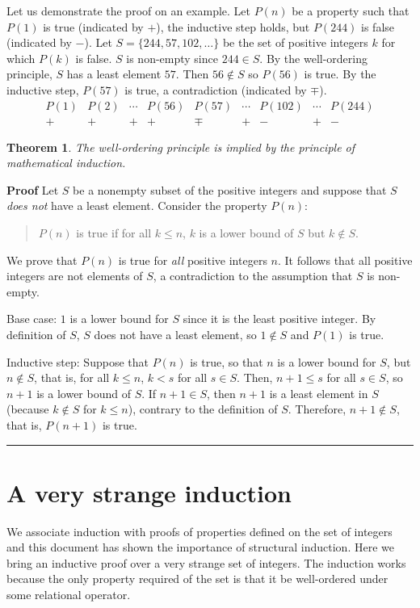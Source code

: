 \documentclass[11pt,a4paper]{report}
\newcommand*{\qed}{\hfill\rule{1ex}{1.5ex}}
\newtheorem{theorem}{Theorem}
\begin{document}
Let us demonstrate the proof on an example. Let $P(n)$ be a property such that $P(1)$ is true (indicated by $+$), the inductive step holds, but $P(244)$ is false (indicated by $-$). Let $S=\{244,57,102,\ldots\}$ be the set of positive integers $k$ for which $P(k)$ is false. $S$ is non-empty since $244\in S$. By the well-ordering principle, $S$ has a least element $57$. Then $56\not\in S$ so $P(56)$ is true. By the inductive step, $P(57)$ is true, a contradiction (indicated by $\mp$).
\[
\begin{array}{ccccccccc}
P(1) & P(2) & \cdots & P(56) & P(57) & \cdots & P(102) & \cdots & P(244)\\
+ & + & + & + & \mp & + & -&+&-
\end{array}
\]
\begin{theorem}
The well-ordering principle is implied by the principle of mathematical induction.
\end{theorem}

\textbf{Proof} Let $S$ be a nonempty subset of the positive integers and suppose that $S$ \emph{does not} have a least element. Consider the property $P(n)$:
\begin{quote}
$P(n)$ is true if for all $k\leq n$, $k$ is a lower bound of $S$ but $k\not \in S$.
\end{quote}
We prove that $P(n)$ is true for \emph{all} positive integers $n$. It follows that all positive integers are not elements of $S$, a contradiction to the assumption that $S$ is non-empty.

Base case: $1$ is a lower bound for $S$ since it is the least positive integer. By definition of $S$, $S$ does not have a least element, so $1\not\in S$ and $P(1)$ is true.

Inductive step: Suppose that $P(n)$ is true, so that $n$ is a lower bound for $S$, but $n\not\in S$, that is, for all $k\leq n$, $k<s$ for all $s\in S$. Then, $n+1\leq s$ for all $s \in S$, so $n+1$ is a lower bound of $S$. If $n+1\in S$, then $n+1$ is a least element in $S$ (because $k\not\in S$ for $k\leq n$), contrary to the definition of $S$. Therefore, $n+1\not\in S$, that is, $P(n+1)$ is true.\qed


\newpage

\section{A very strange induction}

We associate induction with proofs of properties defined on the set of integers and this document has shown the importance of structural induction. Here we bring an inductive proof over a very strange set of integers. The induction works because the only property required of the set is that it be well-ordered under some relational operator.
\end{document}
